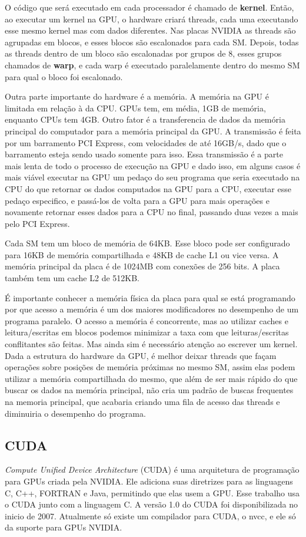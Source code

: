 O código que será executado em cada processador é chamado de \textbf{kernel}. Então, ao executar um kernel na GPU, o 
hardware criará threads, cada uma executando esse mesmo kernel mas com dados diferentes. Nas placas NVIDIA as threads 
são agrupadas em blocos, e esses blocos são escalonados para cada SM. Depois, todas as threads dentro de um bloco são 
escalonadas por grupos de 8, esses grupos chamados de \textbf{warp}, e cada warp é executado paralelamente dentro do 
mesmo SM para qual o bloco foi escalonado.

Outra parte importante do hardware é a memória. A memória na GPU é limitada em relação à da CPU. GPUs tem, em média, 1GB
de memória, enquanto CPUs tem 4GB. Outro fator é a transferencia de dados da memória principal do computador para a memória 
principal da GPU. A transmissão é feita por um barramento PCI Express, com velocidades de até 16GB/s, dado que o
barramento esteja sendo usado somente para isso. Essa transmissão é a parte mais lenta de todo o
processo de execução na GPU e dado isso, em alguns casos é mais viável executar na GPU um pedaço do seu programa que seria executado
na CPU do que retornar os dados computados na GPU para a CPU, executar esse pedaço especifico, e passá-los de volta para a GPU 
para mais operações e novamente retornar esses dados para a CPU no final, passando duas vezes a mais pelo PCI Express. 

Cada SM tem um bloco de memória de 64KB. Esse bloco pode ser configurado para 16KB de memória compartilhada e 48KB
de cache L1 ou vice versa. A memória principal da placa é de 1024MB com conexões de 256 bits. A placa também tem um
cache L2 de 512KB.

É importante conhecer a memória física da placa para qual se está programando por que acesso a memória é um dos maiores
modificadores no desempenho de um programa paralelo. O acesso a memória é concorrente, mas ao utilizar caches e leitura/escritas em
blocos podemos minimizar a taxa com que leituras/escritas conflitantes são feitas. Mas ainda sim é necessário atenção ao escrever um
kernel. Dada a estrutura do hardware da GPU, é melhor deixar threads que façam operações sobre posições de memória próximas no mesmo
SM, assim elas podem utilizar a memória compartilhada do mesmo, que além de ser mais rápido do que buscar os dados na memória principal,
não cria um padrão de buscas frequentes na memoria principal, que acabaria criando uma fila de acesso das threads e diminuiria o desempenho
do programa.

\subsection{CUDA}
\textit{Compute Unified Device Architecture} (CUDA) é uma arquitetura de programação para GPUs criada pela NVIDIA.
Ele adiciona suas diretrizes para as linguagens C, C++, FORTRAN e Java, permitindo que elas usem a GPU.
Esse trabalho usa o CUDA junto com a linguagem C.
A versão 1.0 do CUDA foi disponibilizada no inicio de 2007. Atualmente só existe um compilador para CUDA, o nvcc,
e ele só da suporte para GPUs NVIDIA.

